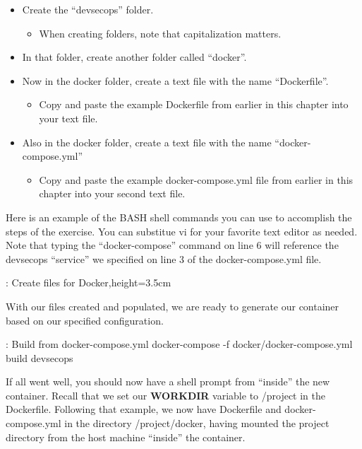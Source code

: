 \begin{itemize}
  \item Create the ``devsecops'' folder.
        \begin{itemize}
          \item When creating folders, note that capitalization matters.
        \end{itemize}
  \item In that folder, create another folder called ``docker''.
  \item Now in the docker folder, create a text file with the name ``Dockerfile''.
        \begin{itemize}
          \item
                Copy and paste the example Dockerfile from earlier in this chapter
                into your text file.
        \end{itemize}
  \item Also in the docker folder, create a text file with the name ``docker-compose.yml''
        \begin{itemize}
          \item Copy and paste the example docker-compose.yml file from earlier
          in this chapter into your second text file.
        \end{itemize}
\end{itemize}

\justify{}
Here is an example of the BASH shell commands you can use to accomplish
the steps of the exercise. You can substitue vi for your favorite text
editor as needed. Note that typing the ``docker-compose'' command on line
6 will reference the devsecops ``service'' we specified on line 3 of the
docker-compose.yml file.

\justify{}
\begin{mybox}{\thetcbcounter: Create files for Docker,height=3.5cm}
  
\end{mybox}

\justify{}
With our files created and populated, we are ready to generate our
container based on our specified configuration.

\begin{mybox}{\thetcbcounter: Build from docker-compose.yml}
  docker-compose -f docker/docker-compose.yml build devsecops
\end{mybox}

\justify{}
If all went well, you should now have a shell prompt from ``inside'' the
new container. Recall that we set our \textbf{WORKDIR} variable to 
/project in the Dockerfile. Following that example, we now have Dockerfile
and docker-compose.yml in the directory /project/docker, having mounted the
project directory from the host machine ``inside'' the container.

